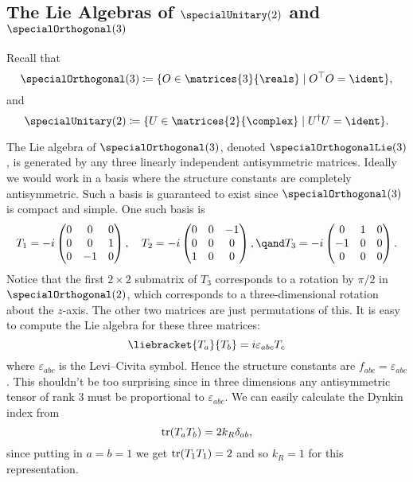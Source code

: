 \subsection{The Lie Algebras of \texorpdfstring{\(\specialUnitary(2)\)}{SU(2)} and \texorpdfstring{\(\specialOrthogonal(3)\)}{SO(3)}}
Recall that
\begin{equation}
    \specialOrthogonal(3) \coloneqq \{ O \in \matrices{3}{\reals} \mid O^\trans O = \ident \},
\end{equation}
and
\begin{equation}
    \specialUnitary(2) \coloneqq \{ U \in \matrices{2}{\complex} \mid U^\hermit U = \ident \}.
\end{equation}

The Lie algebra of \(\specialOrthogonal(3)\), denoted \(\specialOrthogonalLie(3)\), is generated by any three linearly independent antisymmetric matrices.
Ideally we would work in a basis where the structure constants are completely antisymmetric.
Such a basis is guaranteed to exist since \(\specialOrthogonal(3)\) is compact and simple.
One such basis is
\begin{equation}
    T_1 = -i
    \begin{pmatrix}
        0 & 0 & 0\\
        0 & 0 & 1\\
        0 & -1 & 0
    \end{pmatrix}
    , \quad T_2 = -i
    \begin{pmatrix}
        0 & 0 & -1\\
        0 & 0 & 0\\
        1 & 0 & 0
    \end{pmatrix}
    , \qand T_3 = -i
    \begin{pmatrix}
        0 & 1 & 0\\
        -1 & 0 & 0\\
        0 & 0 & 0
    \end{pmatrix}
    .
\end{equation}
Notice that the first \(2\times 2\) submatrix of \(T_3\) corresponds to a rotation by \(\pi/2\) in \(\specialOrthogonal(2)\), which corresponds to a three-dimensional rotation about the \(z\)-axis.
The other two matrices are just permutations of this.
It is easy to compute the Lie algebra for these three matrices:
\begin{equation}
    \liebracket{T_a}{T_b} = i\varepsilon_{abc}T_c
\end{equation}
where \(\varepsilon_{abc}\) is the Levi--Civita symbol.
Hence the structure constants are \(f_{abc} = \varepsilon_{abc}\).
This shouldn't be too surprising since in three dimensions any antisymmetric tensor of rank 3 must be proportional to \(\varepsilon_{abc}\).
We can easily calculate the Dynkin index from
\begin{equation}
    \operatorname{tr}(T_aT_b) = 2k_R\delta_{ab},
\end{equation}
since putting in \(a = b = 1\) we get \(\operatorname{tr}(T_1T_1) = 2\) and so \(k_R = 1\) for this representation.

